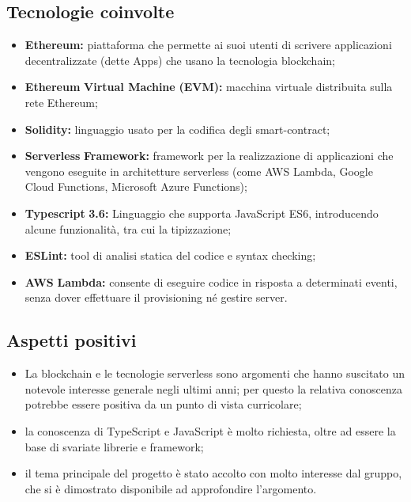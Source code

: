 \subsection{Tecnologie coinvolte}
	\begin{itemize}
		\item \textbf{Ethereum}\textbf{:} piattaforma che permette ai suoi utenti di scrivere applicazioni decentralizzate (dette \DJ Apps) che usano la tecnologia blockchain;
		\item \textbf{Ethereum} \textbf{Virtual Machine} \textbf{(EVM}\textbf{):} macchina virtuale distribuita sulla rete Ethereum; 
		\item \textbf{Solidity:} linguaggio usato per la codifica degli smart-contract; 
		\item \textbf{Serverless} \textbf{Framework}\textbf{:} framework per la realizzazione di applicazioni che vengono eseguite in architetture serverless (come AWS Lambda, Google Cloud Functions, Microsoft Azure Functions); 
		\item \textbf{Typescript} \textbf{3.6:} Linguaggio che supporta JavaScript ES6, introducendo alcune funzionalità, tra cui la tipizzazione;
		\item \textbf{ESLint}\textbf{:} tool di analisi statica del codice e syntax checking; 
		\item \textbf{AWS} \textbf{Lambda:} consente di eseguire codice in risposta a determinati eventi, senza dover effettuare il provisioning né gestire server.
	\end{itemize}

\subsection{Aspetti positivi}
	\begin{itemize}
		\item La blockchain e le tecnologie serverless sono argomenti che hanno suscitato un notevole interesse generale negli ultimi anni; per questo la relativa conoscenza potrebbe essere positiva da un punto di vista curricolare; 
		\item la conoscenza di TypeScript e JavaScript è molto richiesta, oltre ad essere la base di svariate librerie e framework; 
		\item il tema principale del progetto è stato accolto con molto interesse dal gruppo, che si è dimostrato disponibile ad approfondire l'argomento. 
	\end{itemize}

